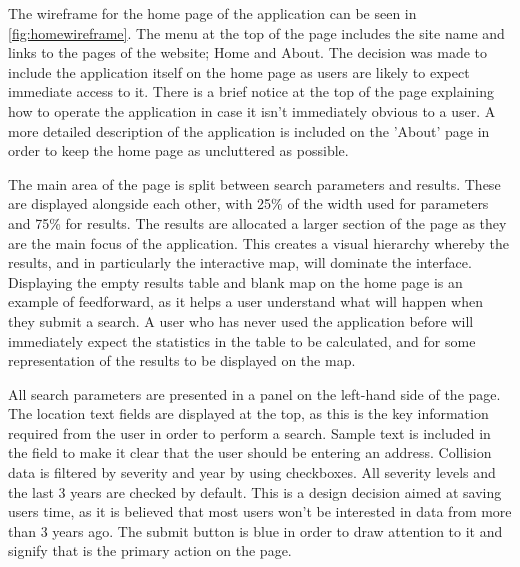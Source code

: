 \documentclass[authoryearcitations]{UoYCSproject}
\begin{document}
The wireframe for the home page of the application can be seen in \autoref{fig:homewireframe}. The menu at the top of the page includes the site name and links to the pages of the website; Home and About. The decision was made to include the application itself on the home page as users are likely to expect immediate access to it. There is a brief notice at the top of the page explaining how to operate the application in case it isn't immediately obvious to a user. A more detailed description of the application is included on the 'About' page in order to keep the home page as uncluttered as possible. 

The main area of the page is split between search parameters and results. These are displayed alongside each other, with 25\% of the width used for parameters and 75\% for results. The results are allocated a larger section of the page as they are the main focus of the application. This creates a visual hierarchy whereby the results, and in particularly the interactive map, will dominate the interface. Displaying the empty results table and blank map on the home page is an example of feedforward, as it helps a user understand what will happen when they submit a search. A user who has never used the application before will immediately expect the statistics in the table to be calculated, and for some representation of the results to be displayed on the map. 

All search parameters are presented in a panel on the left-hand side of the page. The location text fields are displayed at the top, as this is the key information required from the user in order to perform a search. Sample text is included in the field to make it clear that the user should be entering an address. Collision data is filtered by severity and year by using checkboxes. All severity levels and the last 3 years are checked by default. This is a design decision aimed at saving users time, as it is believed that most users won't be interested in data from more than 3 years ago. The submit button is blue in order to draw attention to it and signify that is the primary action on the page.
\end{document}
